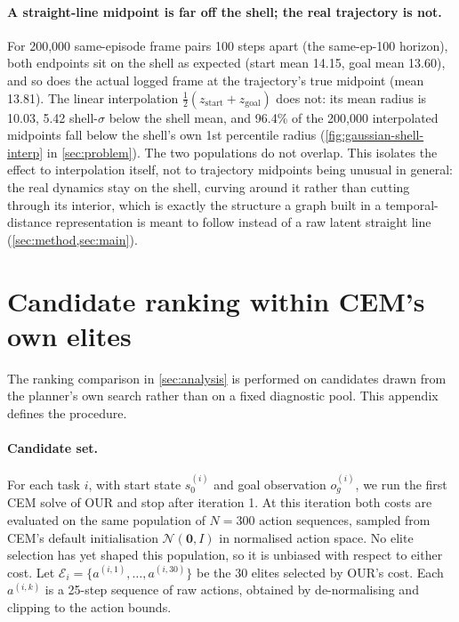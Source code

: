 \documentclass{article} %
\theoremstyle{definition}
\theoremstyle{remark}
\begin{document}
\paragraph{A straight-line midpoint is far off the shell; the real trajectory is not.} For 200{,}000
same-episode frame pairs 100 steps apart (the same-ep-100 horizon), both endpoints sit on the
shell as expected (start mean 14.15, goal mean 13.60), and so does the actual logged frame at the
trajectory's true midpoint (mean 13.81). The linear interpolation
$\tfrac12(z_{\mathrm{start}}+z_{\mathrm{goal}})$ does not: its mean radius is 10.03, 5.42
shell-$\sigma$ below the shell mean, and 96.4\% of the 200{,}000 interpolated midpoints fall below
the shell's own 1st percentile radius (\cref{fig:gaussian-shell-interp} in \cref{sec:problem}). The two populations do
not overlap. This isolates the effect to interpolation itself, not to trajectory midpoints being
unusual in general: the real dynamics stay on the shell, curving around it rather than cutting
through its interior, which is exactly the structure a graph built in a temporal-distance
representation is meant to follow instead of a raw latent straight line
(\cref{sec:method,sec:main}).



\section{Candidate ranking within CEM's own elites}
\label{app:cem-trace}
The ranking comparison in \cref{sec:analysis} is performed on candidates drawn from the planner's
own search rather than on a fixed diagnostic pool. This appendix defines the procedure.

\paragraph{Candidate set.} For each task $i$, with start state $s_0^{(i)}$ and goal observation
$o_g^{(i)}$, we run the first CEM solve of OUR and stop after iteration 1. At this iteration
both costs are evaluated on the same population of $N=300$ action sequences, sampled from
CEM's default initialisation $\mathcal{N}(\mathbf{0}, I)$ in normalised action space. No elite
selection has yet shaped this population, so it is unbiased with respect to either cost. Let
$\mathcal{E}_i = \{a^{(i,1)}, \dots, a^{(i,30)}\}$ be the 30 elites selected by OUR's cost.
Each $a^{(i,k)}$ is a 25-step sequence of raw actions, obtained by de-normalising and clipping
to the action bounds.
\end{document}
